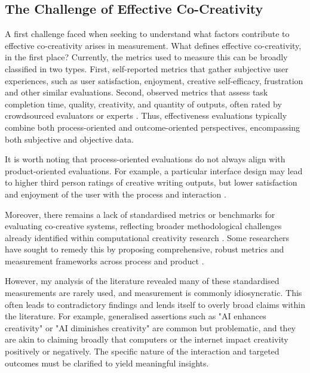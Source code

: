 \subsection{The Challenge of Effective Co-Creativity}

A first challenge faced when seeking to understand what factors contribute to effective co-creativity arises in measurement. What defines effective co-creativity, in the first place? Currently, the metrics used to measure this can be broadly classified in two types. First, self-reported metrics that gather subjective user experiences, such as user satisfaction, enjoyment, creative self-efficacy, frustration and other similar evaluations. Second, observed metrics that assess task completion time, quality, creativity, and quantity of outputs, often rated by crowdsourced evaluators or experts \cite{Kim2021-fh, Kantosalo2019-pz, Rezwana2022-ui, Rezwana2023-gj, Lawton2023-tb}. Thus, effectiveness evaluations typically combine both process-oriented and outcome-oriented perspectives, encompassing both subjective and objective data.

It is worth noting that process-oriented evaluations do not always align with product-oriented evaluations. For example, a particular interface design may lead to higher third person ratings of creative writing outputs, but lower satisfaction and enjoyment of the user with the process and interaction \cite{Lee2022-rj}. 

Moreover, there remains a lack of standardised metrics or benchmarks for evaluating co-creative systems, reflecting broader methodological challenges already identified within computational creativity research \cite{Jordanous2012-kw}. Some researchers have sought to remedy this by proposing comprehensive, robust metrics and measurement frameworks across process and product \cite{Kantosalo2019-pz, Davis2016-te, Lawton2023-gd, Lee2022-rj}. 

However, my analysis of the literature revealed many of these standardised measurements are rarely used, and measurement is commonly idiosyncratic. This often leads to contradictory findings and lends itself to overly broad claims within the literature. For example, generalised assertions such as "AI enhances creativity" or "AI diminishes creativity" are common but problematic, and they are akin to claiming broadly that computers or the internet impact creativity positively or negatively. The specific nature of the interaction and targeted outcomes must be clarified to yield meaningful insights.

